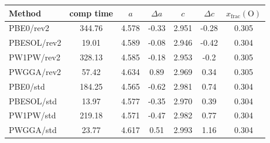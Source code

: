 \documentclass[a4paper,12pt]{scrartcl}
\begin{document}
\begin{table}[H]
	\centering
	\label{tab:tio2-relax}
	\begin{tabular}{lcccccc}
		\toprule
		Method      & comp time & $a$   & $\Delta a $ & $c$   & $\Delta c$ & $x_\mathrm{frac} \mathrm{(O)}$ \\
		\midrule
		PBE0/rev2   & 344.76    & 4.578 & -0.33       & 2.951 & -0.28      & 0.305                          \\
		PBESOL/rev2 & 19.01     & 4.589 & -0.08       & 2.946 & -0.42      & 0.304                          \\
		PW1PW/rev2  & 328.13    & 4.585 & -0.18       & 2.953 & -0.2       & 0.305                          \\
		PWGGA/rev2  & 57.42     & 4.634 & 0.89        & 2.969 & 0.34       & 0.305                          \\
		PBE0/std    & 184.25    & 4.565 & -0.62       & 2.981 & 0.74       & 0.304                          \\
		PBESOL/std  & 13.97     & 4.577 & -0.35       & 2.970 & 0.39       & 0.304                          \\
		PW1PW/std   & 219.18    & 4.571 & -0.47       & 2.982 & 0.77       & 0.304                          \\
		PWGGA/std   & 23.77     & 4.617 & 0.51        & 2.993 & 1.16       & 0.304                          \\
		\bottomrule
	\end{tabular}
\end{table}
%
\end{document}
